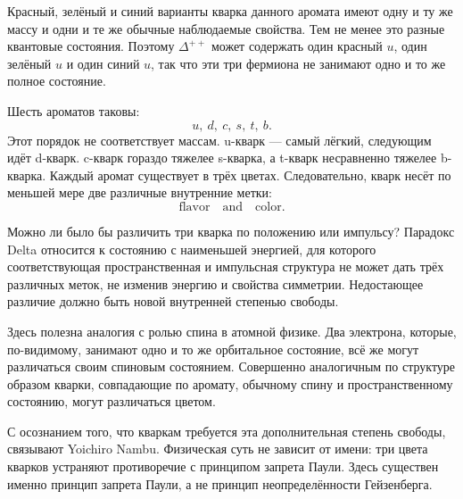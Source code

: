Красный, зелёный и синий варианты кварка данного аромата имеют одну и ту же массу и одни и те же обычные наблюдаемые свойства. Тем не менее это разные квантовые состояния. Поэтому \(\Delta^{++}\) может содержать один красный \(u\), один зелёный \(u\) и один синий \(u\), так что эти три фермиона не занимают одно и то же полное состояние.

Шесть ароматов таковы:
\begin{equation}
u,\ d,\ c,\ s,\ t,\ b.
\end{equation}
Этот порядок не соответствует массам. u-кварк — самый лёгкий, следующим идёт d-кварк. c-кварк гораздо тяжелее s-кварка, а t-кварк несравненно тяжелее b-кварка. Каждый аромат существует в трёх цветах. Следовательно, кварк несёт по меньшей мере две различные внутренние метки:
\begin{equation}
\text{flavor}\quad\text{and}\quad\text{color}.
\end{equation}

Можно ли было бы различить три кварка по положению или импульсу? Парадокс Delta относится к состоянию с наименьшей энергией, для которого соответствующая пространственная и импульсная структура не может дать трёх различных меток, не изменив энергию и свойства симметрии. Недостающее различие должно быть новой внутренней степенью свободы.

Здесь полезна аналогия с ролью спина в атомной физике. Два электрона, которые, по-видимому, занимают одно и то же орбитальное состояние, всё же могут различаться своим спиновым состоянием. Совершенно аналогичным по структуре образом кварки, совпадающие по аромату, обычному спину и пространственному состоянию, могут различаться цветом.


С осознанием того, что кваркам требуется эта дополнительная степень свободы, связывают Yoichiro Nambu. Физическая суть не зависит от имени: три цвета кварков устраняют противоречие с принципом запрета Паули. Здесь существен именно принцип запрета Паули, а не принцип неопределённости Гейзенберга.


